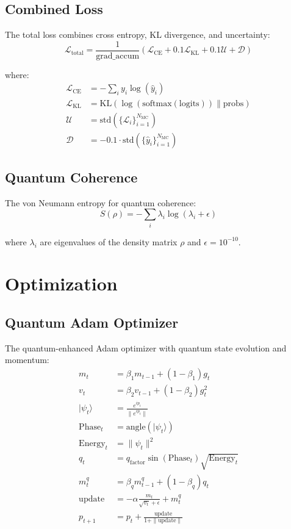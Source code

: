 \documentclass{article}
\begin{document}
\subsection{Combined Loss}
The total loss combines cross entropy, KL divergence, and uncertainty:
\begin{equation}
\mathcal{L}_{\text{total}} = \frac{1}{\text{grad\_accum}}\left(\mathcal{L}_{\text{CE}} + 0.1\mathcal{L}_{\text{KL}} + 0.1\mathcal{U} + \mathcal{D}\right)
\end{equation}

where:
\begin{align*}
\mathcal{L}_{\text{CE}} &= -\sum_{i} y_i \log(\hat{y}_i) \\
\mathcal{L}_{\text{KL}} &= \text{KL}(\log(\text{softmax}(\text{logits})) \| \text{probs}) \\
\mathcal{U} &= \text{std}(\{\mathcal{L}_i\}_{i=1}^{N_{\text{MC}}}) \\
\mathcal{D} &= -0.1 \cdot \text{std}(\{\hat{y}_i\}_{i=1}^{N_{\text{MC}}})
\end{align*}

\subsection{Quantum Coherence}
The von Neumann entropy for quantum coherence:
\begin{equation}
S(\rho) = -\sum_i \lambda_i \log(\lambda_i + \epsilon)
\end{equation}

where $\lambda_i$ are eigenvalues of the density matrix $\rho$ and $\epsilon=10^{-10}$.

\section{Optimization}

\subsection{Quantum Adam Optimizer}
The quantum-enhanced Adam optimizer with quantum state evolution and momentum:
\begin{align*}
m_t &= \beta_1 m_{t-1} + (1-\beta_1)g_t \\
v_t &= \beta_2 v_{t-1} + (1-\beta_2)g_t^2 \\
|\psi_t\rangle &= \frac{e^{i p_t}}{\|e^{i p_t}\|} \\
\text{Phase}_t &= \text{angle}(|\psi_t\rangle) \\
\text{Energy}_t &= \|\psi_t\|^2 \\
q_t &= q_{\text{factor}} \sin(\text{Phase}_t) \sqrt{\text{Energy}_t} \\
m^q_t &= \beta_q m^q_{t-1} + (1-\beta_q)q_t \\
\text{update} &= -\alpha\frac{m_t}{\sqrt{v_t} + \epsilon} + m^q_t \\
p_{t+1} &= p_t + \frac{\text{update}}{1 + \|\text{update}\|}
\end{align*}
\end{document}
